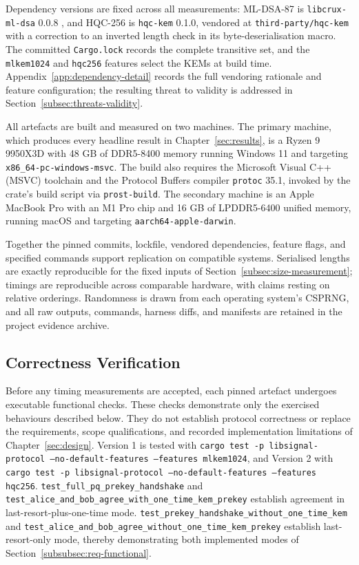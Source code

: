 Dependency versions are fixed across all measurements: ML-DSA-87 is \texttt{libcrux-ml-dsa} 0.0.8 \cite{noauthor_cratesio_2026}, and HQC-256 is \texttt{hqc-kem} 0.1.0, vendored at \texttt{third-party/hqc-kem} with a correction to an inverted length check in its byte-deserialisation macro. The committed \texttt{Cargo.lock} records the complete transitive set, and the \texttt{mlkem1024} and \texttt{hqc256} features select the KEMs at build time. Appendix~\ref{app:dependency-detail} records the full vendoring rationale and feature configuration; the resulting threat to validity is addressed in Section~\ref{subsec:threats-validity}.

All artefacts are built and measured on two machines. The primary machine, which produces every headline result in Chapter~\ref{sec:results}, is a Ryzen 9 9950X3D with 48 GB of DDR5-8400 memory running Windows 11 and targeting \texttt{x86\_64-pc-windows-msvc}. The build also requires the Microsoft Visual C++ (MSVC) toolchain and the Protocol Buffers compiler \texttt{protoc} 35.1, invoked by the crate's build script via \texttt{prost-build}. The secondary machine is an Apple MacBook Pro with an M1 Pro chip and 16 GB of LPDDR5-6400 unified memory, running macOS and targeting \texttt{aarch64-apple-darwin}.

Together the pinned commits, lockfile, vendored dependencies, feature flags, and specified commands support replication on compatible systems. Serialised lengths are exactly reproducible for the fixed inputs of Section~\ref{subsec:size-measurement}; timings are reproducible across comparable hardware, with claims resting on relative orderings. Randomness is drawn from each operating system's CSPRNG, and all raw outputs, commands, harness diffs, and manifests are retained in the project evidence archive.

\subsection{Correctness Verification}
\label{subsec:correctness}

Before any timing measurements are accepted, each pinned artefact undergoes executable functional checks. These checks demonstrate only the exercised behaviours described below. They do not establish protocol correctness or replace the requirements, scope qualifications, and recorded implementation limitations of Chapter~\ref{sec:design}. Version 1 is tested with \texttt{cargo test -p libsignal-protocol --no-default-features --features mlkem1024}, and Version 2 with \texttt{cargo test -p libsignal-protocol --no-default-features --features hqc256}. \texttt{test\_full\_pq\_prekey\_handshake} and \texttt{test\_alice\_and\_bob\_\allowbreak agree\_with\_one\_time\_kem\_prekey} establish agreement in last-resort-plus-one-time mode. \texttt{test\_prekey\_handshake\_\allowbreak without\_one\_time\_kem} and \texttt{test\_alice\_and\_bob\_\allowbreak agree\_without\_one\_time\_kem\_prekey} establish last-resort-only mode, thereby demonstrating both implemented modes of Section~\ref{subsubsec:req-functional}.

